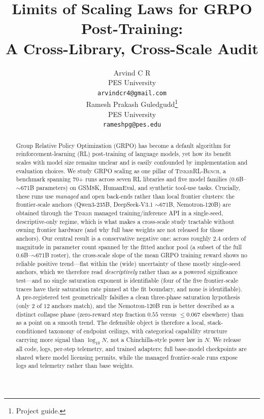 \documentclass{article}
\title{Limits of Scaling Laws for GRPO Post-Training:\\
       A Cross-Library, Cross-Scale Audit}
\author{
  Arvind C R \\
  PES University\\
  \texttt{arvindcr4@gmail.com} \\
  \And
  Ramesh Prakash Guledgudd\thanks{Project guide.} \\
  PES University\\
  \texttt{rameshpg@pes.edu} \\
}
\newcommand{\ours}{\textsc{TinkerRL-Bench}}
\begin{document}
\sloppy {}  \hfuzz=2pt
\maketitle
\begin{abstract}
Group Relative Policy Optimization (GRPO) has become a default algorithm for
reinforcement-learning (RL) post-training of language models, yet how its benefit
scales with model size remains unclear and is easily confounded by implementation
and evaluation choices. We study GRPO scaling as one pillar of \ours{}, a
benchmark spanning 70+ runs across seven RL libraries and five model families
($0.6$B--$\sim$671B parameters) on GSM8K, HumanEval, and synthetic tool-use tasks.
Crucially, these runs use \emph{managed} and open back-ends rather than local
frontier clusters: the frontier-scale anchors (Qwen3-235B, DeepSeek-V3.1
$\sim$671B, Nemotron-120B) are obtained through the \textsc{Tinker} managed
training/inference API in a single-seed, descriptive-only regime, which is what
makes a cross-scale study tractable without owning frontier hardware (and why full
base weights are not released for those anchors).
Our central result is a conservative negative one: across roughly $2.4$ orders of
magnitude in parameter count spanned by the fitted anchor pool (a subset of the
full $0.6$B--$\sim$671B roster), the cross-scale slope of the mean GRPO training
reward shows no reliable positive trend---flat within the (wide) uncertainty of
these mostly single-seed anchors, which we therefore read \emph{descriptively}
rather than as a powered significance test---and no single saturation exponent is identifiable
(four of the five frontier-scale traces have their saturation rate pinned at the
fit boundary, and none is identifiable). A pre-registered test geometrically falsifies a clean three-phase
saturation hypothesis (only $2$ of $12$ anchors match), and the Nemotron-120B run
is better described as a distinct collapse phase (zero-reward step fraction $0.55$
versus $\le 0.067$ elsewhere) than as a point on a smooth trend. The defensible
object is therefore a local, stack-conditioned taxonomy of endpoint ceilings,
with categorical capability structure carrying more signal than $\log_{10} N$,
not a Chinchilla-style power law in $N$. We
release all code, logs, per-step telemetry, and trained adapters; full base-model
checkpoints are shared where model licensing permits, while the managed
frontier-scale runs expose logs and telemetry rather than base weights.
\end{abstract}
\end{document}
